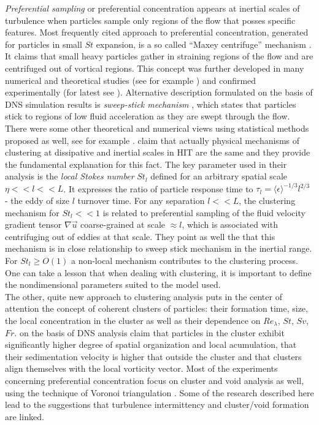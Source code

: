 \documentclass[../main.tex]{subfiles}
\begin{document}
 \emph{Preferential sampling} or preferential concentration appears at inertial scales of turbulence when particles sample only regions of the flow that posses specific features.  Most frequently cited approach to preferential concentration, generated for particles in small $St$ expansion, is a so called “Maxey centrifuge” mechanism \citep{Maxey1987}. It claims that small heavy particles gather in straining regions of the flow and are centrifuged out of vortical regions. This  concept was further developed in many numerical and theoretical studies (see for example \citet{Sigurgeirsson2002,Cencini2006}) and confirmed experimentally (for latest see \citet{Bhatnagar2018}). Alternative description formulated on the basis of DNS simulation results is \emph{sweep-stick mechanism} \citep{Goto2008,Coleman2009}, which states that particles stick to regions of low fluid acceleration as they are swept through the flow. There were some other theoretical and numerical views using statistical methods proposed as well, see for example \citet{Falkovich2002, Bec2007, Hartlep2017}. \citet{Bragg2015a} claim that actually physical mechanisms of clustering at dissipative and inertial scales in HIT are the same and they provide the fundamental explanation for this fact. The key parameter used in their analysis is the \emph{local Stokes number} $St_l$ defined for an arbitrary spatial scale $ \eta << l << L$. It expresses the ratio of particle response time to $\tau_l= \langle \epsilon\rangle^{-1/3} l^{2/3}$ - the eddy of size $l$ turnover time. For any separation $l<<L$, the clustering mechanism for $St_l<<1$ is related to preferential sampling of the fluid velocity gradient tensor $\nabla \vec{u}$ coarse-grained at scale $\approx l$, which is associated with centrifuging out of eddies at that scale. They point as well the that this mechanism is in close relationship to sweep stick mechanism in the inertial range. For $St_l \geq O(1)$ a non-local mechanism contributes to the clustering process. One can take a lesson that when dealing with clustering, it is important to define the nondimensional parameters suited to the model used.\\
The other, quite new approach to clustering analysis puts in the center of attention the concept of coherent clusters of particles: their formation time, size, the local concentration in the cluster as well as their dependence on $Re_{\lambda}$, $St$, $Sv$, $Fr$. \citet{Baker2017, Momenifar2019} on the basis of DNS analysis claim that particles in the cluster exhibit significantly higher degree of spatial organization and local acumulation, that their sedimentation velocity is higher that outside the cluster and that clusters align themselves with the local vorticity vector. Most of the  experiments concerning preferential concentration focus on cluster and void analysis as well, using the technique of Voronoi triangulation \citep{Monchaux2010,Monchaux2012, Obligado2014, Sumbekova2017, Manish2018}. Some of the research described here lead to the suggestions that turbulence intermittency and cluster/void formation are linked.\\
\end{document}
